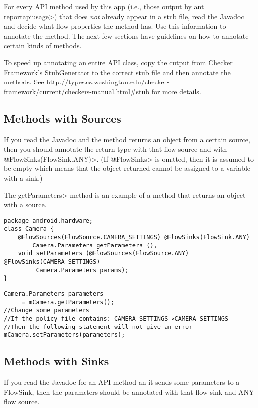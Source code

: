 For every API method used by this app (i.e., those output by \<ant
reportapiusage>) that does \emph{not} already appear in a stub file, read the Javadoc and decide what flow properties the method
has.  Use this information to annotate the method.  The next few sections have guidelines on
how to annotate certain kinds of methods. 

To speed up annotating an entire API class, copy the output from Checker Framework's StubGenerator to 
the correct stub file and then annotate the methods.  See \url{http://types.cs.washington.edu/checker-framework/current/checkers-manual.html#stub} for more details. 

\subsection{Methods with Sources}
If you read the Javadoc and the method returns an object from a certain source, then you should annotate
the return type with that flow source and with \<@FlowSinks(FlowSink.ANY)>.  (If \<@FlowSinks> is omitted, then it is assumed to be empty
 which means that the object returned cannot be assigned to a variable with a sink.)

The \<getParameters> method is an example of a method that returns an object with a source.
\begin{Verbatim}
package android.hardware;
class Camera {
    @FlowSources(FlowSource.CAMERA_SETTINGS) @FlowSinks(FlowSink.ANY)
        Camera.Parameters getParameters ();
    void setParameters (@FlowSources(FlowSource.ANY) @FlowSinks(CAMERA_SETTINGS) 
         Camera.Parameters params);
}
\end{Verbatim}

\begin{Verbatim}
Camera.Parameters parameters
     = mCamera.getParameters();
//Change some parameters
//If the policy file contains: CAMERA_SETTINGS->CAMERA_SETTINGS
//Then the following statement will not give an error
mCamera.setParameters(parameters);
\end{Verbatim}



\subsection{Methods with Sinks}
If you read the Javadoc for an API method an it sends some parameters to a FlowSink, then the parameters
should be annotated with that flow sink and ANY flow source.  

